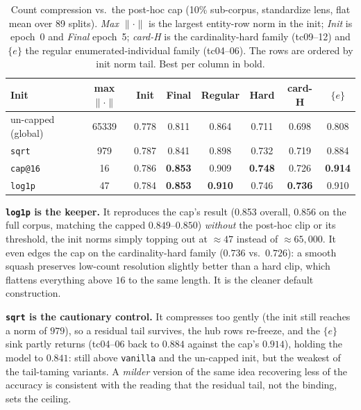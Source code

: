 \documentclass[a4paper,oneside,bibliography=totoc]{scrbook}
\begin{document}
\begin{table}[t]
\centering
\small
\caption{Count compression vs.\ the post-hoc cap (10\% sub-corpus, standardize
lens, flat mean over 89 splits). \emph{Max $\lVert\cdot\rVert$} is the largest
entity-row norm in the init; \emph{Init} is epoch~0 and \emph{Final} epoch~5;
\emph{card-H} is the cardinality-hard family (tc09--12) and \emph{$\{e\}$} the
regular enumerated-individual family (tc04--06). The rows are ordered by init
norm tail. Best per column in bold.}
\label{tab:dbpedia_compress}
\setlength{\tabcolsep}{5pt}
\begin{tabular}{lccccccc}
\toprule
\textbf{Init} & \textbf{max $\lVert\cdot\rVert$} & \textbf{Init} & \textbf{Final}
& \textbf{Regular} & \textbf{Hard} & \textbf{card-H} & \textbf{$\{e\}$} \\
\midrule
un-capped (global) & 65339 & 0.778 & 0.811 & 0.864 & 0.711 & 0.698 & 0.808 \\
\texttt{sqrt}      & 979   & 0.787 & 0.841 & 0.898 & 0.732 & 0.719 & 0.884 \\
\texttt{cap@16}    & 16    & 0.786 & \textbf{0.853} & 0.909 & \textbf{0.748} & 0.726 & \textbf{0.914} \\
\texttt{log1p}     & 47    & 0.784 & \textbf{0.853} & \textbf{0.910} & 0.746 & \textbf{0.736} & 0.910 \\
\bottomrule
\end{tabular}
\end{table}

\textbf{\texttt{log1p} is the keeper.} It reproduces the cap's result (0.853
overall, $0.856$ on the full corpus, matching the capped $0.849$--$0.850$)
\emph{without} the post-hoc clip or its threshold, the init norms simply topping
out at $\approx 47$ instead of $\approx 65{,}000$. It even edges the cap on the
cardinality-hard family ($0.736$ vs.\ $0.726$): a smooth squash preserves
low-count resolution slightly better than a hard clip, which flattens everything
above $16$ to the same length. It is the cleaner default construction.

\textbf{\texttt{sqrt} is the cautionary control.} It compresses too gently (the
init still reaches a norm of $979$), so a residual tail survives, the hub rows
re-freeze, and the $\{e\}$ sink partly returns (tc04--06 back to $0.884$ against
the cap's $0.914$), holding the model to $0.841$: still above \texttt{vanilla}
and the un-capped init, but the weakest of the tail-taming variants. A
\emph{milder} version of the same idea recovering less of the accuracy is
consistent with the reading that the residual tail, not the binding, sets the
ceiling.
\end{document}
